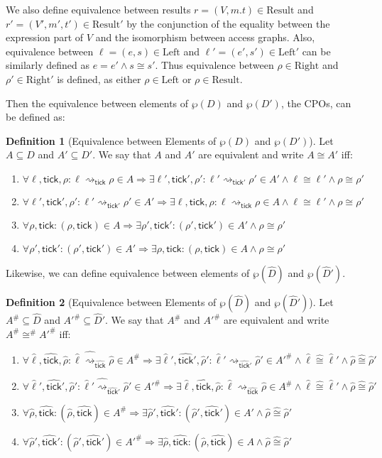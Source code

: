 \documentclass{article}
\theoremstyle{definition}
\newtheorem{definition}{Definition}[section]
\newcommand*{\A}[1]{\widehat{#1}}
\newcommand*{\Abs}[1]{{#1}^{\#}}
\newcommand*{\Left}{\text{Left}}
\newcommand*{\Right}{\text{Right}}
\newcommand*{\mem}{m}
\newcommand*{\Result}{\text{Result}}
\newcommand*{\semarrow}{\rightsquigarrow}
\newcommand*{\tick}{\mathsf{tick}}
\begin{document}
We also define equivalence between results $r=(V,\mem.t)\in\Result$ and $r'=(V',\mem',t')\in\Result'$ by the conjunction of the equality between the expression part of $V$ and the isomorphism between access graphs.
Also, equivalence between $\ell=(e,s)\in\Left$ and $\ell'=(e',s')\in\Left'$ can be similarly defined as $e=e'\wedge s\cong s'$.
Thus equivalence between $\rho\in\Right$ and $\rho'\in\Right'$ is defined, as either $\rho\in\Left$ or $\rho\in\Result$.

Then the equivalence between elements of $\wp(D)$ and $\wp(D')$, the CPOs, can be defined as:
\begin{definition}[Equivalence between Elements of $\wp(D)$ and $\wp(D')$]
  Let $A\subseteq D$ and $A'\subseteq D'$. We say that $A$ and $A'$ are equivalent and write $A\cong A'$ iff:
  \begin{enumerate}
    \item $\forall\ell,\tick,\rho:\ell\semarrow_{\tick}\rho\in A\Rightarrow\exists\ell',\tick',\rho':\ell'\semarrow_{\tick'}\rho'\in A'\wedge\ell\cong\ell'\wedge\rho\cong\rho'$
    \item $\forall\ell',\tick',\rho':\ell'\semarrow_{\tick'}\rho'\in A'\Rightarrow\exists\ell,\tick,\rho:\ell\semarrow_{\tick}\rho\in A\wedge\ell\cong\ell'\wedge\rho\cong\rho'$
    \item $\forall\rho,\tick:(\rho,{\tick})\in A\Rightarrow\exists\rho',\tick':(\rho',{\tick'})\in A'\wedge\rho\cong\rho'$
    \item $\forall\rho',\tick':(\rho',{\tick'})\in A'\Rightarrow\exists\rho,\tick:(\rho,{\tick})\in A\wedge\rho\cong\rho'$
  \end{enumerate}
\end{definition}

Likewise, we can define equivalence between elements of $\wp(\A{D})$ and $\wp(\A{D}')$.
\begin{definition}[Equivalence between Elements of $\wp(\A{D})$ and $\wp(\A{D}')$]
  Let $\Abs{A}\subseteq \A{D}$ and $\Abs{A'}\subseteq \A{D}'$. We say that $\Abs{A}$ and $\Abs{A'}$ are equivalent and write $\Abs{A}\Abs\cong \Abs{A'}$ iff:
  \begin{enumerate}
    \item $\forall\A\ell,\A\tick,\A\rho:\A\ell\A\semarrow_{\A\tick}\A\rho\in \Abs{A}\Rightarrow\exists\A\ell',\A\tick',\A\rho':\A\ell'\semarrow_{\A\tick'}\A\rho'\in \Abs{A'}\wedge\A\ell\A\cong\A\ell'\wedge\A\rho\A\cong\A\rho'$
    \item $\forall\A\ell',\A\tick',\A\rho':\A\ell'\A\semarrow_{\A\tick'}\A\rho'\in \Abs{A'}\Rightarrow\exists\A\ell,\A\tick,\A\rho:\A\ell\semarrow_{\A\tick}\A\rho\in \Abs{A}\wedge\A\ell\A\cong\A\ell'\wedge\A\rho\A\cong\A\rho'$
    \item $\forall\A\rho,\A\tick:(\A\rho,\A{\tick})\in \Abs{A}\Rightarrow\exists\A\rho',\A\tick':(\A\rho',\A{\tick}')\in A'\wedge\A\rho\A\cong\A\rho'$
    \item $\forall\A\rho',\A\tick':(\A\rho',\A{\tick}')\in \Abs{A'}\Rightarrow\exists\A\rho,\A\tick:(\A\rho,\A{\tick})\in A\wedge\A\rho\A\cong\A\rho'$
  \end{enumerate}
\end{definition}
\end{document}
